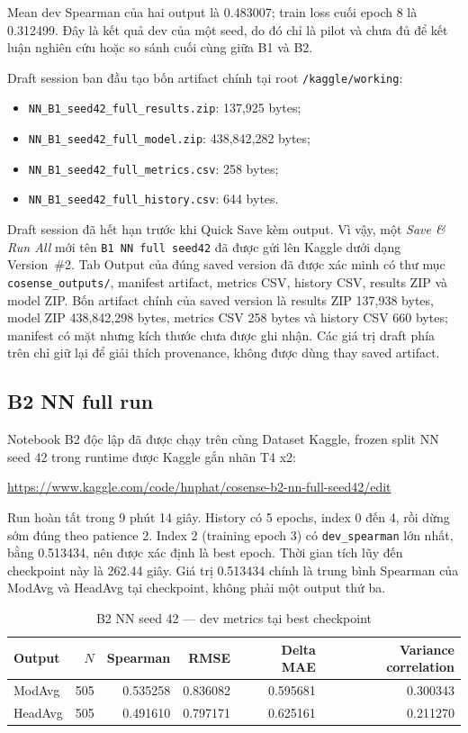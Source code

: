 \documentclass[11pt,a4paper]{article}
\newcommand{\code}[1]{\nolinkurl{#1}}
\begin{document}
Mean dev Spearman của hai output là 0.483007; train loss cuối epoch 8 là 0.312499. Đây là kết quả dev của một seed, do đó chỉ là pilot và chưa đủ để kết luận nghiên cứu hoặc so sánh cuối cùng giữa B1 và B2.

Draft session ban đầu tạo bốn artifact chính tại root \code{/kaggle/working}:
\begin{itemize}
  \item \code{NN_B1_seed42_full_results.zip}: 137,925 bytes;
  \item \code{NN_B1_seed42_full_model.zip}: 438,842,282 bytes;
  \item \code{NN_B1_seed42_full_metrics.csv}: 258 bytes;
  \item \code{NN_B1_seed42_full_history.csv}: 644 bytes.
\end{itemize}

Draft session đã hết hạn trước khi Quick Save kèm output. Vì vậy, một \emph{Save \& Run All} mới tên \code{B1 NN full seed42} đã được gửi lên Kaggle dưới dạng Version~\#2. Tab Output của đúng saved version đã được xác minh có thư mục \code{cosense_outputs/}, manifest artifact, metrics CSV, history CSV, results ZIP và model ZIP. Bốn artifact chính của saved version là results ZIP 137,938 bytes, model ZIP 438,842,298 bytes, metrics CSV 258 bytes và history CSV 660 bytes; manifest có mặt nhưng kích thước chưa được ghi nhận. Các giá trị draft phía trên chỉ giữ lại để giải thích provenance, không được dùng thay saved artifact.

\subsection{B2 NN full run}

Notebook B2 độc lập đã được chạy trên cùng Dataset Kaggle, frozen split NN seed 42 trong runtime được Kaggle gắn nhãn T4 x2:
\begin{center}
\url{https://www.kaggle.com/code/hnphat/cosense-b2-nn-full-seed42/edit}
\end{center}

Run hoàn tất trong 9 phút 14 giây. History có 5 epochs, index 0 đến 4, rồi dừng sớm đúng theo patience 2. Index 2 (training epoch 3) có \code{dev_spearman} lớn nhất, bằng 0.513434, nên được xác định là best epoch. Thời gian tích lũy đến checkpoint này là 262.44 giây. Giá trị 0.513434 chính là trung bình Spearman của ModAvg và HeadAvg tại checkpoint, không phải một output thứ ba.

\begin{table}[htbp]
\centering
\caption{B2 NN seed 42 --- dev metrics tại best checkpoint}
\small
\begin{tabularx}{\textwidth}{@{}lrrrrr@{}}
\toprule
Output & $N$ & Spearman & RMSE & Delta MAE & Variance correlation \\
\midrule
ModAvg  & 505 & 0.535258 & 0.836082 & 0.595681 & 0.300343 \\
HeadAvg & 505 & 0.491610 & 0.797171 & 0.625161 & 0.211270 \\
\bottomrule
\end{tabularx}
\end{table}
\end{document}
